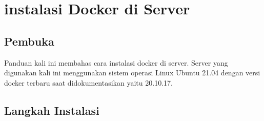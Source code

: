 \chapter{instalasi Docker di Server}

\section{Pembuka}

Panduan kali ini membahas cara instalasi docker di server. Server yang digunakan kali ini menggunakan sistem operasi 
Linux Ubuntu 21.04 dengan versi docker terbaru saat didokumentasikan yaitu 20.10.17. 

\section{Langkah Instalasi}

